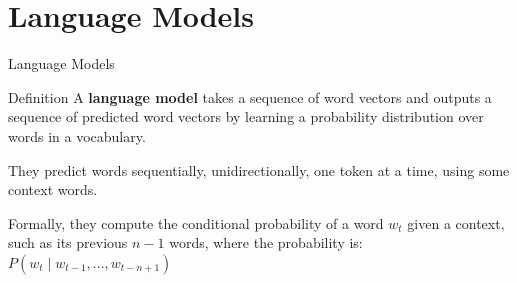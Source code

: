 
\section{Language Models}




\begin{frame}{Language Models}
    
    \begin{definitionBlock}{Definition}
    A \alert{\textbf{language model}} takes a sequence of word vectors and outputs a sequence of predicted word vectors by learning a probability distribution over words in a vocabulary.
    
    They predict words sequentially, unidirectionally, one token at a time, using some context words. 
    
    
    \end{definitionBlock}
    
    Formally, they compute the conditional probability of a word $w_t$ given a context, such as its previous $n-1$ words, where the probability is: $P(w_t \; | \; w_{t-1}, ..., w_{t-n+1})$
    
\end{frame}






